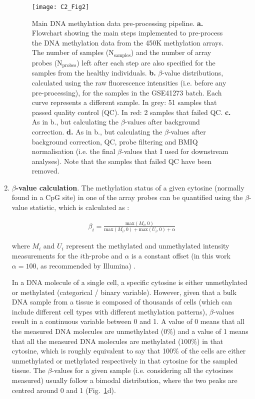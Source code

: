 \begin{enumerate}
	
	\begin{figure}[htbp!] 
		\centering    
		\texttt{[image: C2\_Fig2]}
		\vspace*{2mm}
		\caption[Main DNA methylation data pre-processing pipeline]{Main DNA methylation data pre-processing pipeline. \textbf{a.} Flowchart showing the main steps implemented to pre-process the DNA methylation data from the 450K methylation arrays. The number of samples (N$_{\text{samples}}$) and the number of array probes (N$_{\text{probes}}$) left after each step are also specified for the samples from the healthy individuals. \textbf{b.}  $\beta$-value distributions, calculated using the raw fluorescence intensities (i.e. before any pre-processing), for the samples in the GSE41273 batch. Each curve represents a different sample. In grey: 51 samples that passed quality control (QC). In red: 2 samples that failed QC.  \textbf{c.} As in b., but calculating the $\beta$-values after background correction. \textbf{d.} As in b., but calculating the $\beta$-values after background correction, QC, probe filtering and BMIQ normalisation (i.e. the final $\beta$-values that I used for downstream analyses). Note that the samples that failed QC have been removed.}
		\label{fig:c2_fig2}
	\end{figure}
	
	
	\item \textbf{$\beta$-value calculation}. The methylation status of a given cytosine (normally found in a CpG site) in one of the array probes can be quantified using the $\beta$-value statistic, which is calculated as \citep{Wilhelm-Benartzi2013,Du2010}:
	
	\begin{align}
	\beta_i = \frac{\text{max}(M_i,0)}{\text{max}(M_i,0) + \text{max}(U_i,0) + \alpha}
	\end{align}
	
	where $M_i$ and $U_i$ represent the methylated and unmethylated intensity measurements for the $i$th-probe and $\alpha$ is a constant offset (in this work $\alpha = 100$, as recommended by Illumina) \citep{Du2010}. 
	
	In a DNA molecule of a single cell, a specific cytosine is either unmethylated or methylated (categorical / binary variable). However, given that a bulk DNA sample from a tissue is composed of thousands of cells (which can include different cell types with different methylation patterns), $\beta$-values result in a continuous variable between 0 and 1. A value of 0 means that all the measured DNA molecules are unmethylated ($0\%$) and a value of 1 means that all the measured DNA molecules are methylated ($100\%$) in that cytosine, which is roughly equivalent to say that 100\% of the cells are either unmethylated or methylated respectively in that cytosine for the sampled tissue. The $\beta$-values for a given sample (i.e. considering all the cytosines measured) usually follow a bimodal distribution, where the two peaks are centred around 0 and 1 (Fig.~\ref{fig:c2_fig2}d). 
	

\end{enumerate}
